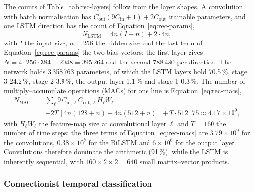 The counts of Table~\ref{tab:rec-layers} follow from the layer shapes.
A convolution with batch normalisation has $C_{\mathrm{out}}(9C_{\mathrm{in}}+1)+2C_{\mathrm{out}}$ trainable parameters, and one LSTM direction has the count of Equation~\ref{eq:rec-params},
\begin{equation}
N_{\mathrm{LSTM}}=4n(I+n)+2\cdot4n,
\label{eq:rec-params}
\end{equation}
with $I$ the input size, $n=256$ the hidden size and the last term of Equation~\ref{eq:rec-params} the two bias vectors; the first layer gives $N=4\cdot256\cdot384+2048=395\,264$ and the second $788\,480$ per direction.
The network holds 3\,358\,763 parameters, of which the LSTM layers hold 70.5\,\%, stage 3 24.2\,\%, stage 2 3.9\,\%, the output layer 1.1\,\% and stage 1 0.3\,\%.
The number of multiply--accumulate operations (MACs) for one line is Equation~\ref{eq:rec-macs},
\begin{equation}
\begin{split}N_{\mathrm{MAC}}={}&\sum_\ell 9\,C_{\mathrm{in},\ell}C_{\mathrm{out},\ell}H_\ell W_\ell\\&+2T\,[4n(128+n)+4n(512+n)]+T\cdot512\cdot75\approx4.17\times10^9,\end{split}
\label{eq:rec-macs}
\end{equation}
with $H_\ell W_\ell$ the feature-map size at convolutional layer $\ell$ and $T=160$ the number of time steps: the three terms of Equation~\ref{eq:rec-macs} are $3.79\times10^9$ for the convolutions, $0.38\times10^9$ for the BiLSTM and $6\times10^6$ for the output layer.
Convolutions therefore dominate the arithmetic (91\,\%), while the LSTM is inherently sequential, with $160\times2\times2=640$ small matrix--vector products.

\subsubsection{Connectionist temporal classification}

